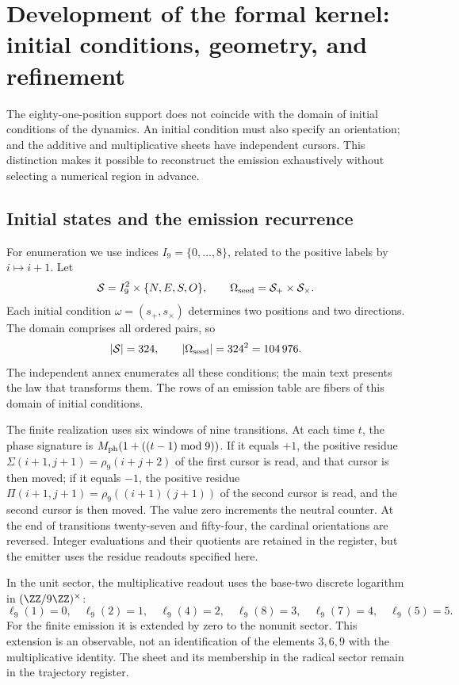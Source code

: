 \section{Development of the formal kernel: initial conditions, geometry, and refinement}
\label{sec:extension}

The eighty-one-position support does not coincide with the domain of initial conditions of the dynamics. An initial condition must also specify an orientation; and the additive and multiplicative sheets have independent cursors. This distinction makes it possible to reconstruct the emission exhaustively without selecting a numerical region in advance.

\subsection{Initial states and the emission recurrence}

For enumeration we use indices \(I_9=\{0,\ldots,8\}\), related to the positive labels by \(i\mapsto i+1\). Let
\[
 \mathcal S=I_9^2\times\{N,E,S,O\},\qquad
 \Omega_{\rm seed}=\mathcal S_+\times\mathcal S_\times.
\]
Each initial condition \(\omega=(s_+,s_\times)\) determines two positions and two directions. The domain comprises all ordered pairs, so
\begin{equation}
 |\mathcal S|=324,\qquad |\Omega_{\rm seed}|=324^2=104\,976.
 \label{eq:semillas}
\end{equation}
The independent annex enumerates all these conditions; the main text presents the law that transforms them. The rows of an emission table are fibers of this domain of initial conditions.

The finite realization uses six windows of nine transitions. At each time \(t\), the phase signature is \(M_{\rm ph}(1+((t-1)\bmod9))\). If it equals \(+1\), the positive residue \(\Sigma(i+1,j+1)=\rho_9(i+j+2)\) of the first cursor is read, and that cursor is then moved; if it equals \(-1\), the positive residue \(\Pi(i+1,j+1)=\rho_9((i+1)(j+1))\) of the second cursor is read, and the second cursor is then moved. The value zero increments the neutral counter. At the end of transitions twenty-seven and fifty-four, the cardinal orientations are reversed. Integer evaluations and their quotients are retained in the register, but the emitter uses the residue readouts specified here.

In the unit sector, the multiplicative readout uses the base-two discrete logarithm in \((\ZZ/9\ZZ)^\times\):
\[
 \ell_9(1)=0,\quad\ell_9(2)=1,\quad\ell_9(4)=2,\quad
 \ell_9(8)=3,\quad\ell_9(7)=4,\quad\ell_9(5)=5.
\]
For the finite emission it is extended by zero to the nonunit sector. This extension is an observable, not an identification of the elements \(3,6,9\) with the multiplicative identity. The sheet and its membership in the radical sector remain in the trajectory register.

